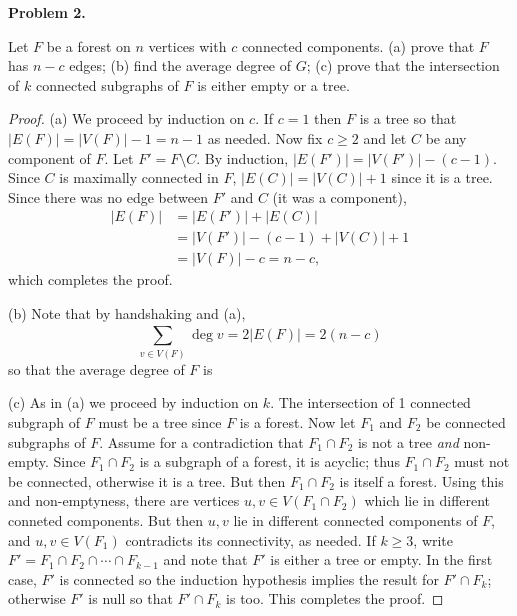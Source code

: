 \noindent\textbf{Problem 2.}

Let \( F \) be a forest on \( n \) vertices with \( c \) connected components. (a) prove that \( F \) has \( n - c \) edges; (b) find the average degree of \( G \); (c) prove that the intersection of \( k \) connected subgraphs of \( F \) is either empty or a tree.
\begin{proof} (a) We proceed by induction on \( c \). If \( c = 1 \) then \( F \) is a tree so that \( |E(F)| = |V(F)| - 1 = n - 1 \) as needed. Now fix \( c \geq 2 \) and let \( C \) be any component of \( F \). Let \( F' = F \setminus C \). By induction, \( |E(F')| = |V(F')| - (c - 1) \). Since \( C \) is maximally connected in \( F \), \( |E(C)| = |V(C)| + 1 \) since it is a tree. Since there was no edge between \( F' \) and \( C \) (it was a component),
	\begin{align*}
		|E(F)| &= |E(F')| + |E(C)| \\
		       &= |V(F')| - (c - 1) + |V(C)| + 1 \\
		       &= |V(F)| - c = n - c,
	\end{align*}
	which completes the proof.

	(b) Note that by handshaking and (a), \[ \sum_{v \in V(F)}^{} \deg v = 2 |E(F)| = 2(n - c)  \] so that the average degree of \( F \) is 

	(c) As in (a) we proceed by induction on \( k \). The intersection of 1 connected subgraph of \( F \) must be a tree since \( F \) is a forest. Now let \( F_1 \) and \( F_2 \) be connected subgraphs of \( F \). Assume for a contradiction that \( F_1 \cap F_2 \) is not a tree \emph{and} non-empty. Since \( F_1 \cap F_2 \) is a subgraph of a forest, it is acyclic; thus \( F_1 \cap F_2 \) must not be connected, otherwise it is a tree. But then \( F_1 \cap F_2 \) is itself a forest. Using this and non-emptyness, there are vertices \( u,v \in V(F_1 \cap F_2) \) which lie in different conneted components. But then \( u,v \) lie in different connected components of \( F \), and \( u,v \in V(F_1) \) contradicts its connectivity, as needed. If \( k \geq 3 \), write \( F' = F_1 \cap F_2 \cap \cdots \cap F_{k-1}  \) and note that \( F' \) is either a tree or empty. In the first case, \( F' \) is connected so the induction hypothesis implies the result for \( F' \cap F_{k}  \); otherwise \( F' \) is null so that \( F' \cap F_{k}  \) is too. This completes the proof.
\end{proof}
